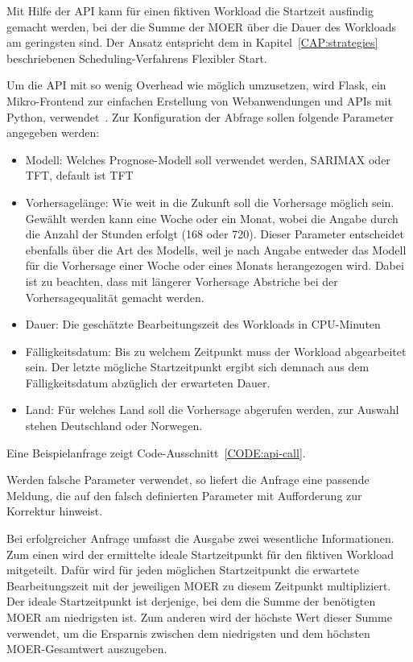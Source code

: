 Mit Hilfe der \ac{API} kann für einen fiktiven Workload die Startzeit ausfindig gemacht werden, bei der die Summe der \ac{MOER} über die Dauer des Workloads am geringsten sind.
Der Ansatz entspricht dem in Kapitel~\ref{CAP:strategies} beschriebenen Scheduling-Verfahrens \glqq Flexibler Start\grqq{}.

Um die \ac{API} mit so wenig Overhead wie möglich umzusetzen, wird Flask, ein Mikro-Frontend zur einfachen Erstellung von Webanwendungen und \acp{API} mit Python, verwendet~\cite{Flask.02032024}.
Zur Konfiguration der Abfrage sollen folgende Parameter angegeben werden:
\begin{itemize}
 \item Modell: Welches Prognose-Modell soll verwendet werden, \ac{SARIMAX} oder \ac{TFT}, default ist \ac{TFT}
 \item Vorhersagelänge: Wie weit in die Zukunft soll die Vorhersage möglich sein.
 Gewählt werden kann eine Woche oder ein Monat, wobei die Angabe durch die Anzahl der Stunden erfolgt (168 oder 720).
 Dieser Parameter entscheidet ebenfalls über die Art des Modells, weil je nach Angabe entweder das Modell für die Vorhersage einer Woche oder eines Monats herangezogen wird.
 Dabei ist zu beachten, dass mit längerer Vorhersage Abstriche bei der Vorhersagequalität gemacht werden.
 \item Dauer: Die geschätzte Bearbeitungszeit des Workloads in \ac{CPU}-Minuten
 \item Fälligkeitsdatum: Bis zu welchem Zeitpunkt muss der Workload abgearbeitet sein.
 Der letzte mögliche Startzeitpunkt ergibt sich demnach aus dem Fälligkeitsdatum abzüglich der erwarteten Dauer.
 \item Land: Für welches Land soll die Vorhersage abgerufen werden, zur Auswahl stehen Deutschland oder Norwegen.
\end{itemize}
Eine Beispielanfrage zeigt Code-Ausschnitt~\ref{CODE:api-call}.

Werden falsche Parameter verwendet, so liefert die Anfrage eine passende Meldung, die auf den falsch definierten Parameter mit Aufforderung zur Korrektur hinweist.

Bei erfolgreicher Anfrage umfasst die Ausgabe zwei wesentliche Informationen.
Zum einen wird der ermittelte ideale Startzeitpunkt für den fiktiven Workload mitgeteilt.
Dafür wird für jeden möglichen Startzeitpunkt die erwartete Bearbeitungszeit mit der jeweiligen \ac{MOER} zu diesem Zeitpunkt multipliziert.
Der ideale Startzeitpunkt ist derjenige, bei dem die Summe der benötigten \ac{MOER} am niedrigsten ist.
Zum anderen wird der höchste Wert dieser Summe verwendet, um die Ersparnis zwischen dem niedrigsten und dem höchsten \ac{MOER}-Gesamtwert auszugeben.

